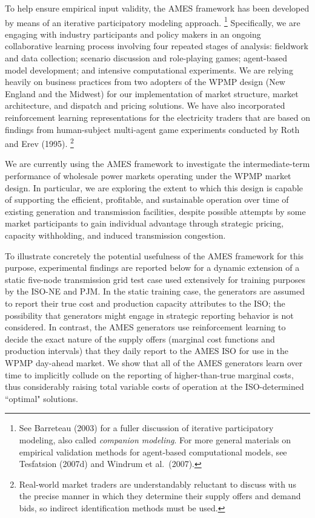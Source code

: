 \documentclass[12pt]{article}
\begin{document}
To help ensure empirical input validity, the AMES framework has been developed by means of an 
iterative participatory modeling approach.%
  \footnote{See Barreteau (2003) for a fuller discussion of iterative participatory modeling, also called 
   \textit{companion modeling\/}.  For more general materials on empirical 
    validation methods for agent-based computational models, see Tesfatsion (2007d) and Windrum et al.~(2007).}
Specifically, we are engaging with industry participants and policy makers 
in an ongoing collaborative learning process involving four repeated stages 
of analysis: fieldwork and data collection;
scenario discussion and role-playing games; agent-based model development; and intensive
computational experiments.  We are relying heavily on
business practices from two adopters of the WPMP design (New
England and the Midwest) for our implementation of market
structure, market architecture, and dispatch and pricing
solutions.  We have also incorporated reinforcement learning representations
for the electricity traders that are based on findings from
human-subject multi-agent game experiments conducted by Roth and Erev (1995).%
   \footnote{Real-world market traders are understandably reluctant to discuss with us the precise manner in which they determine their supply offers and demand bids, so indirect identification methods must be used.} 

We are currently using the AMES framework 
to investigate the intermediate-term performance of wholesale power markets 
operating under the WPMP market design.  In particular, we are exploring the extent to which this design
is capable of supporting the efficient, profitable, and sustainable operation over time of existing generation and 
transmission facilities, despite possible attempts by some
market participants to gain individual advantage through strategic pricing, capacity
withholding, and induced transmission congestion. 

To illustrate concretely the potential usefulness of the AMES framework for this purpose, experimental findings are reported below for a dynamic extension of a static five-node transmission grid test case used extensively for training purposes by the ISO-NE and PJM.  In the static training case, the generators are assumed to report their true cost and production capacity attributes to the ISO; the possibility that generators might engage in strategic reporting behavior is not considered.  In contrast, the AMES generators use reinforcement learning to decide the exact nature of the supply offers (marginal cost functions and production intervals) that they daily report to the AMES ISO for use in the WPMP day-ahead market.  We show that all of the AMES generators learn over time to implicitly collude on the reporting of higher-than-true marginal costs, thus considerably raising total variable costs of operation at the ISO-determined ``optimal" solutions.  
\end{document}
